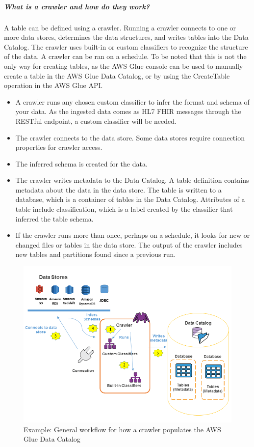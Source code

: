 \documentclass[10pt]{article}
\begin{document}
\subparagraph{What is a crawler and how do they work?}A table can be defined using a crawler. Running a crawler connects to one or more data stores, determines the data structures, and writes tables into the Data Catalog. The crawler uses built-in or custom classifiers to recognize the structure of the data. A crawler can be ran on a schedule. To be noted that this is not the only way for creating tables, as the AWS Glue console can be used to manually create a table in the AWS Glue Data Catalog, or by using the CreateTable operation in the AWS Glue API. \cite{aws-crawlers}
\begin{itemize}
    \item A crawler runs any chosen custom classifier to infer the format and schema of your data. As the ingested data comes as HL7 FHIR messages through the RESTful endpoint, a custom classifier will be needed.
    \item The crawler connects to the data store. Some data stores require connection properties for crawler access.
    \item The inferred schema is created for the data.
    \item The crawler writes metadata to the Data Catalog. A table definition contains metadata about the data in the data store. The table is written to a database, which is a container of tables in the Data Catalog. Attributes of a table include classification, which is a label created by the classifier that inferred the table schema.
    \item If the crawler runs more than once, perhaps on a schedule, it looks for new or changed files or tables in the data store. The output of the crawler includes new tables and partitions found since a previous run.
\end{itemize}
\begin{figure}[h!]
	\centering
	\includegraphics[width=0.9\linewidth]{images/PopulateCatalog-overview.png}
	\caption*{Example: General workflow for how a crawler populates the AWS Glue Data Catalog}
\end{figure}
\end{document}
